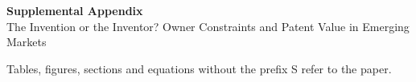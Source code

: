 \documentclass[11pt]{article}
\begin{document}
\begin{center}
{\large\textbf{Supplemental Appendix}}\\[4pt]
{\large The Invention or the Inventor? Owner Constraints and Patent Value in Emerging Markets}
\end{center}
\bigskip

\noindent Tables, figures, sections and equations without the prefix S refer to the paper.


\end{document}
